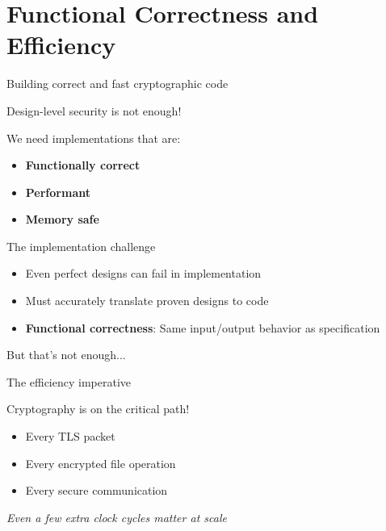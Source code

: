 \documentclass[aspectratio=169, lualatex, handout]{beamer}
\begin{document}
\section{Functional Correctness and Efficiency}

\begin{frame}{Building correct and fast cryptographic code}
	\begin{center}
		\Large
		Design-level security is not enough!

		\vspace{1em}

		We need implementations that are:
		\begin{itemize}
			\item \textbf{Functionally correct}
			\item \textbf{Performant}
			\item \textbf{Memory safe}
		\end{itemize}
	\end{center}
\end{frame}

\begin{frame}{The implementation challenge}
	\begin{itemize}
		\item Even perfect designs can fail in implementation
		\item Must accurately translate proven designs to code
		\item \textbf{Functional correctness}: Same input/output behavior as specification
	\end{itemize}
	\vspace{1em}
	\begin{center}
		\Large
		But that's not enough...
	\end{center}
\end{frame}

\begin{frame}{The efficiency imperative}
	\begin{center}
		\Large
		Cryptography is on the critical path!
	\end{center}
	\vspace{1em}
	\begin{itemize}
		\item Every TLS packet
		\item Every encrypted file operation
		\item Every secure communication
	\end{itemize}
	\vspace{0.5em}
	\begin{center}
		\textit{Even a few extra clock cycles matter at scale}
	\end{center}
\end{frame}
\end{document}
